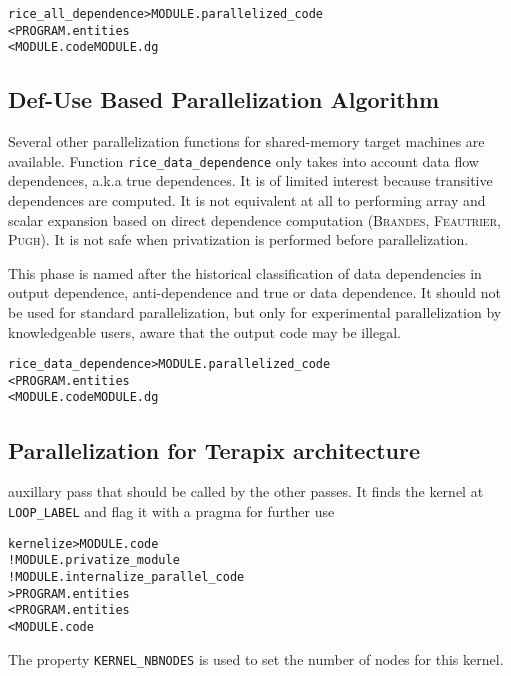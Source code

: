 \documentclass[a4paper]{report}
\newenvironment{PipsMake}{\begin{alltt}}{\end{alltt}}
\begin{document}
\begin{PipsMake}
rice_all_dependence             > MODULE.parallelized_code
        < PROGRAM.entities
        < MODULE.code MODULE.dg
\end{PipsMake}

\subsection{Def-Use Based Parallelization Algorithm}

Several other parallelization functions for shared-memory target
machines are available. Function \verb+rice_data_dependence+ only takes into
account data flow dependences, a.k.a true dependences. It is of limited
interest because transitive dependences are computed. It is not
equivalent at all to performing array and scalar expansion based on direct
dependence computation (\textsc{Brandes}, \textsc{Feautrier}, \textsc{Pugh}).
It is not safe when privatization is performed before parallelization.

This phase is named after the historical classification of data
dependencies in output dependence, anti-dependence and true or data
dependence. It should not be used for standard parallelization, but
only for experimental parallelization by knowledgeable users, aware
that the output code may be illegal.

\begin{PipsMake}
rice_data_dependence            > MODULE.parallelized_code
        < PROGRAM.entities
        < MODULE.code MODULE.dg
\end{PipsMake}


\subsection{Parallelization for Terapix architecture}

auxillary pass that should be called by the other passes.
It finds the kernel at \verb+LOOP_LABEL+ and flag it with a pragma for further use
\begin{PipsMake}
kernelize				> MODULE.code
		! MODULE.privatize_module
		! MODULE.internalize_parallel_code
		> PROGRAM.entities
		< PROGRAM.entities
		< MODULE.code
\end{PipsMake}
The property \verb+KERNEL_NBNODES+ is used to set the number of nodes for this kernel.
\end{document}
